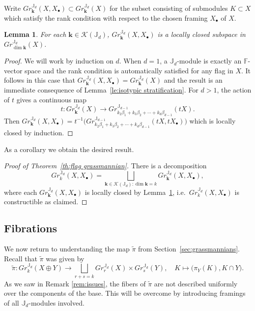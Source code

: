\documentclass{amsart}
\numberwithin{equation}{section}
\newtheorem{lemma}[theorem]{Lemma}
\theoremstyle{definition}
\def\FF{\mathbb{F}}
\def\JJ{\mathbb{J}}
\def\bfk{\mathbf{k}}
\def\cK{\mathcal{K}}
\def\dim{\operatorname{dim}}
\begin{document}
Write $Gr_\bfk^{\JJ_d}(X,X_\bullet)\subset Gr_\bfk^{\JJ_d}(X)$ for the subset consisting of submodules $K\subset X$ which satisfy the rank condition with respect to the chosen framing $X_\bullet$ of $X$.
\begin{lemma}\label{le:isotypic flag grassmannians}
  For each $\bfk\in\cK(\JJ_d)$, $Gr_\bfk^{\JJ_d}(X,X_\bullet)$ is a locally closed subspace in $Gr^{\JJ_d}_{\dim\bfk}(X)$.
\end{lemma}
\begin{proof}
  We will work by induction on $d$.  When $d=1$, a $\JJ_d$-module is exactly an $\FF$-vector space and the rank condition is automatically satisfied for any flag in $X$.  It follows in this case that $Gr_\bfk^{\JJ_d}(X,X_\bullet)=Gr_\bfk^{\JJ_d}(X)$ and the result is an immediate consequence of Lemma~\ref{le:isotypic stratification}.  For $d>1$, the action of $t$ gives a continuous map 
  \[t:Gr_\bfk^{\JJ_d}(X)\to Gr_{k_2\beta_1+k_3\beta_2+\cdots+k_d\beta_{d-1}}^{\JJ_{d-1}}(tX).\]
  Then $Gr_\bfk^{\JJ_d}(X,X_\bullet)=t^{-1}\big(Gr_{k_2\beta_1+k_3\beta_2+\cdots+k_d\beta_{d-1}}^{\JJ_{d-1}}(tX,tX_\bullet)\big)$ which is locally closed by induction.
\end{proof}
As a corollary we obtain the desired result.
\begin{proof}[Proof of Theorem~\ref{th:flag grassmannian}]  
  There is a decomposition
  \begin{equation}\label{eq:flag grassmannian isotypic decomposition}
    Gr_k^{\JJ_d}(X,X_\bullet)=\bigsqcup_{\bfk\in\cK(\JJ_d):\dim\bfk=k} Gr_\bfk^{\JJ_d}(X,X_\bullet),
  \end{equation}
  where each $Gr_\bfk^{\JJ_d}(X,X_\bullet)$ is locally closed by Lemma~\ref{le:isotypic flag grassmannians}, i.e.\ $Gr_k^{\JJ_d}(X,X_\bullet)$ is constructible as claimed.
\end{proof}





\subsection{Fibrations}  
We now return to understanding the map $\tilde\pi$ from Section~\ref{sec:grassmannians}.  Recall that $\tilde\pi$ was given by
\[\tilde\pi:Gr_k^{\JJ_d}(X\oplus Y)\to\bigsqcup_{r+s=k} Gr_r^{\JJ_d}(X)\times Gr_s^{\JJ_d}(Y),\quad K\mapsto \big(\pi_Y(K),K\cap Y\big).\]
As we saw in Remark \ref{rem:issues}, the fibers of $\tilde\pi$ are not described uniformly over the components of the base.  This will be overcome by introducing framings of all $\JJ_d$-modules involved.
\end{document}
